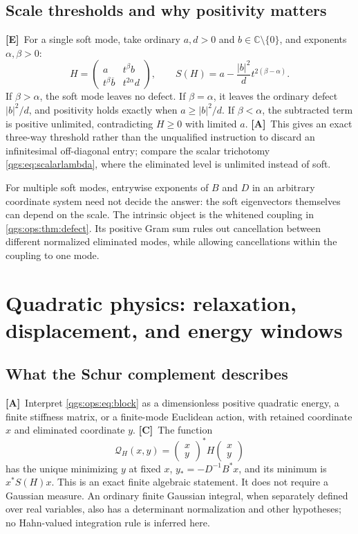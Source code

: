 \documentclass[11pt,oneside]{article}
\numberwithin{equation}{section}
\theoremstyle{plain}
\theoremstyle{definition}
\theoremstyle{remark}
\newcommand{\C}{\mathbb C}
\newcommand{\QH}{\mathcal Q_H}
\newcommand{\abs}[1]{\left|#1\right|}
\newcommand{\TE}{\textcolor{TierE}{\textsf{\bfseries[E]}}}
\newcommand{\TC}{\textcolor{TierC}{\textsf{\bfseries[C]}}}
\newcommand{\TA}{\textcolor{TierA}{\textsf{\bfseries[A]}}}
\begin{document}
\subsection{Scale thresholds and why positivity matters}
\TE\ For a single soft mode, take ordinary $a,d>0$ and $b\in\C\setminus\{0\}$, and exponents $\alpha,\beta>0$:
\begin{equation}\label{qgs:ops:eq:scalar-soft}
 H=\begin{pmatrix}a&t^\beta b\\t^\beta\overline b&t^{2\alpha}d\end{pmatrix},
 \qquad
 S(H)=a-\frac{\abs b^2}{d}t^{2(\beta-\alpha)}.
\end{equation}
If $\beta>\alpha$, the soft mode leaves no defect. If $\beta=\alpha$, it leaves the ordinary defect $\abs b^2/d$, and positivity holds exactly when $a\ge\abs b^2/d$. If $\beta<\alpha$, the subtracted term is positive unlimited, contradicting $H\ge0$ with limited $a$. \TA\ This gives an exact three-way threshold rather than the unqualified instruction to discard an infinitesimal off-diagonal entry; compare the scalar trichotomy \eqref{qgs:eq:scalarlambda}, where the eliminated level is unlimited instead of soft.

For multiple soft modes, entrywise exponents of $B$ and $D$ in an arbitrary coordinate system need not decide the answer: the soft eigenvectors themselves can depend on the scale. The intrinsic object is the whitened coupling in \cref{qgs:ops:thm:defect}. Its positive Gram sum rules out cancellation between different normalized eliminated modes, while allowing cancellations within the coupling to one mode.

\section{Quadratic physics: relaxation, displacement, and energy windows}\label{qgs:ops:sec:quadratic-physics}

\subsection{What the Schur complement describes}
\TA\ Interpret \eqref{qgs:ops:eq:block} as a dimensionless positive quadratic energy, a finite stiffness matrix, or a finite-mode Euclidean action, with retained coordinate $x$ and eliminated coordinate $y$. \TC\ The function
\begin{equation}\label{qgs:ops:eq:Q}
 \QH(x,y)=\begin{pmatrix}x\\y\end{pmatrix}^*
             H\begin{pmatrix}x\\y\end{pmatrix}
\end{equation}
has the unique minimizing $y$ at fixed $x$, $y_*=-D^{-1}B^*x$, and its minimum is $x^*S(H)x$. This is an exact finite algebraic statement. It does not require a Gaussian measure. An ordinary finite Gaussian integral, when separately defined over real variables, also has a determinant normalization and other hypotheses; no Hahn-valued integration rule is inferred here.
\end{document}
